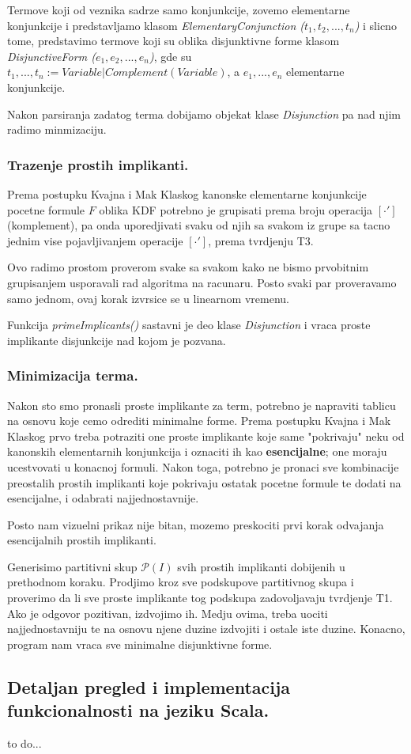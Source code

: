 \documentclass{article}
\begin{document}
Termove koji od veznika sadrze samo konjunkcije, zovemo elementarne konjunkcije i predstavljamo klasom \textit{ElementaryConjunction ($t_1, t_2, ..., t_n$)} i slicno tome, predstavimo termove koji su oblika disjunktivne forme klasom \textit{DisjunctiveForm ($e_1, e_2, ..., e_n$)}, gde su $t_1, ..., t_n := Variable | Complement(Variable)$, a $e_1, ..., e_n$ elementarne konjunkcije.

Nakon parsiranja zadatog terma dobijamo objekat klase \textit{Disjunction} pa nad njim radimo minmizaciju.

\subsubsection{Trazenje prostih implikanti.}
Prema postupku Kvajna i Mak Klaskog kanonske elementarne konjunkcije pocetne formule $F$ oblika KDF potrebno je grupisati prema broju operacija $[\cdot ']$ (komplement), pa onda uporedjivati svaku od njih sa svakom iz grupe sa tacno jednim vise pojavljivanjem operacije $[\cdot ']$, prema tvrdjenju T3.

Ovo radimo prostom proverom svake sa svakom kako ne bismo prvobitnim grupisanjem usporavali rad algoritma na racunaru. Posto svaki par proveravamo samo jednom, ovaj korak izvrsice se u linearnom vremenu.

Funkcija \textit{primeImplicants()} sastavni je deo klase \textit{Disjunction} i vraca proste implikante disjunkcije nad kojom je pozvana.

\subsubsection{Minimizacija terma.}
Nakon sto smo pronasli proste implikante za term, potrebno je napraviti tablicu na osnovu koje cemo odrediti minimalne forme. Prema postupku Kvajna i Mak Klaskog prvo treba potraziti one proste implikante koje same "pokrivaju" neku od kanonskih elementarnih konjunkcija i oznaciti ih kao \textbf{esencijalne}; one moraju ucestvovati u konacnoj formuli. Nakon toga, potrebno je pronaci sve kombinacije preostalih prostih implikanti koje pokrivaju ostatak pocetne formule te dodati na esencijalne, i odabrati najjednostavnije. 

Posto nam vizuelni prikaz nije bitan, mozemo preskociti prvi korak odvajanja esencijalnih prostih implikanti.

Generisimo partitivni skup $\mathcal{P}(I)$ svih prostih implikanti dobijenih u prethodnom koraku. Prodjimo kroz sve podskupove partitivnog skupa i proverimo da li sve proste implikante tog podskupa zadovoljavaju tvrdjenje T1. Ako je odgovor pozitivan, izdvojimo ih. Medju ovima, treba uociti najjednostavniju te na osnovu njene duzine izdvojiti i ostale iste duzine. Konacno, program nam vraca sve minimalne disjunktivne forme.
\subsection{Detaljan pregled i implementacija funkcionalnosti na jeziku Scala.}
to do...
\end{document}
